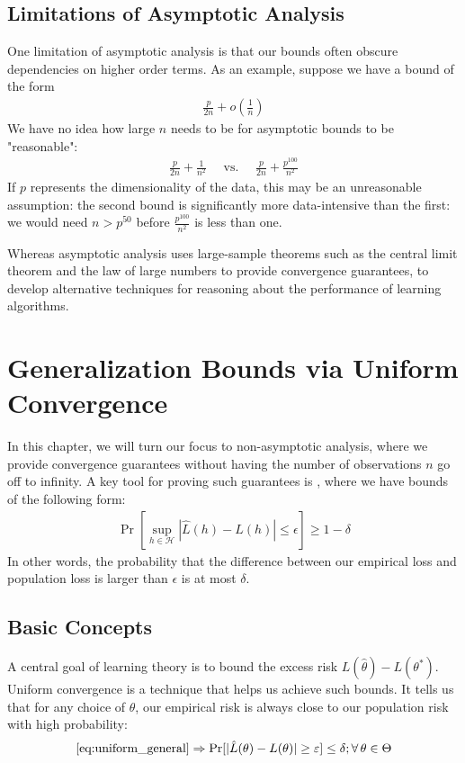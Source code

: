 \documentclass{article}
\begin{document}
\subsection{Limitations of Asymptotic Analysis}
One limitation of asymptotic analysis is that our bounds often obscure dependencies on higher order terms. As an example, suppose we have a bound of the form
\begin{align*}
\frac{p}{2 n}+o\left(\frac{1}{n}\right)
\end{align*}
We have no idea how large $n$ needs to be for asymptotic bounds to be "reasonable":
\begin{align*}
\frac{p}{2 n}+\frac{1}{n^{2}} \quad \text { vs. } \quad \frac{p}{2 n}+\frac{p^{100}}{n^{2}}
\end{align*}
If $p$ represents the dimensionality of the data, this may be an unreasonable assumption: the second bound is significantly more data-intensive than the first: we would need $n>p^{50}$ before $\frac{p^{100}}{n^{2}}$ is less than one. 

Whereas asymptotic analysis uses large-sample theorems such as the central limit theorem and the law of large numbers to provide convergence guarantees,  to develop alternative techniques for reasoning about the performance of learning algorithms.

\section{Generalization Bounds via Uniform Convergence}
In this chapter, we will turn our focus to non-asymptotic analysis, where we provide convergence guarantees without having the number of observations $n$ go off to infinity. A key tool for proving such guarantees is , where we have bounds of the following form:
\begin{align}
\operatorname{Pr}\left[\sup _{h \in \mathcal{H}}|\hat{L}(h)-L(h)| \leq \epsilon\right] \geq 1-\delta \label{eq:uniform_general}
\end{align}
In other words, the probability that the difference between our empirical loss and population loss is larger than $\epsilon$ is at most $\delta$.
\subsection{Basic Concepts}
A central goal of learning theory is to bound the excess risk $L(\hat{\theta})-L\left(\theta^{*}\right)$.  Uniform convergence is a technique that helps us achieve such bounds.
It tells us that for any choice of $\theta$, our empirical risk is always close to our population risk with high probability:
\begin{align}
\cref{eq:uniform_general} \Rightarrow \operatorname{Pr}[|\hat{L}(\theta)-L(\theta)| \geq \varepsilon] \leq \delta ; \forall \theta \in \Theta
\end{align}
\end{document}
